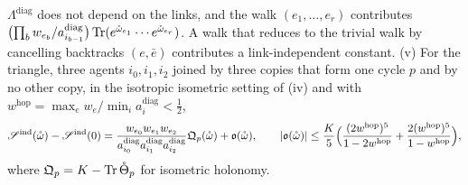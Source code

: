 \(\Lambda^{\mathrm{diag}}\) does not depend on the links, and the walk \((e_1,\ldots,e_r)\) contributes
\(\bigl(\prod_bw_{e_b}/a^{\mathrm{diag}}_{i_{b-1}}\bigr)\operatorname{Tr}(e^{\mathring\omega_{e_1}}\cdots e^{\mathring\omega_{e_r}})\). A walk that
reduces to the trivial walk by cancelling backtracks \((e,\bar e)\) contributes a link-independent
constant.
(v) For the triangle, three agents \(i_0,i_1,i_2\) joined by three copies that form one cycle \(p\)
and by no other copy, in the isotropic isometric setting of (iv) and with
\(w^{\mathrm{hop}}=\max_ew_e/\min_ia^{\mathrm{diag}}_i<\tfrac12\),
\begin{equation}
\mathscr S^{\mathrm{ind}}(\mathring\omega)-\mathscr S^{\mathrm{ind}}(0)
=\frac{w_{e_0}w_{e_1}w_{e_2}}{a^{\mathrm{diag}}_{i_0}a^{\mathrm{diag}}_{i_1}a^{\mathrm{diag}}_{i_2}}\mathfrak Q_p(\mathring\omega)+\mathfrak o(\mathring\omega),
\qquad
\lvert\mathfrak o(\mathring\omega)\rvert\leq\frac K5\Bigl(\frac{(2w^{\mathrm{hop}})^5}{1-2w^{\mathrm{hop}}}+\frac{2(w^{\mathrm{hop}})^5}{1-w^{\mathrm{hop}}}\Bigr),
\label{eq:glink-wilson-triangle}
\end{equation}
where \(\mathfrak Q_p=K-\operatorname{Tr}\mathring\Theta_p\) for isometric holonomy.

